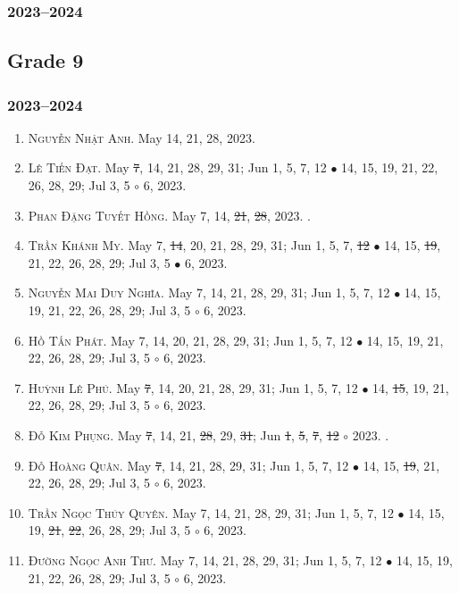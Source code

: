 \documentclass{article}
\begin{document}
\subsubsection{2023--2024}


\subsection{Grade 9}

\subsubsection{2023--2024}

\begin{enumerate}
	\item \textsc{Nguyễn Nhật Anh.} {\sf[In]} May 14, 21, 28, 2023. {\sf[Out]}
	\item \textsc{Lê Tiến Đạt.} May \st{7}, 14, 21, 28, 29, 31; Jun 1, 5, 7, 12 $\bullet$ 14, 15, 19, 21, 22, 26, 28, 29; Jul 3, 5 $\circ$ 6, 2023.
	\item \textsc{Phan Đặng Tuyết Hồng.} May 7, 14, \st{21}, \st{28}, 2023. {}. {\sf[Out]}
	\item \textsc{Trần Khánh My.} May 7, \st{14}, 20, 21,  28, 29, 31; Jun 1, 5, 7, \st{12} $\bullet$ 14, 15, \st{19}, 21, 22, 26, 28, 29; Jul 3, 5 $\bullet$ 6, 2023.
	\item \textsc{Nguyễn Mai Duy Nghĩa.} May 7, 14, 21,  28, 29, 31; Jun 1, 5, 7, 12 $\bullet$ 14, 15, 19, 21, 22, 26, 28, 29; Jul 3, 5 $\circ$ 6, 2023.
	\item \textsc{Hồ Tấn Phát.} May 7, 14, 20, 21, 28, 29, 31; Jun 1, 5, 7, 12 $\bullet$ 14, 15, 19, 21, 22, 26, 28, 29; Jul 3, 5 $\circ$ 6, 2023.
	\item \textsc{Huỳnh Lê Phú.} May \st{7}, 14, 20, 21, 28, 29, 31; Jun 1, 5, 7, 12 $\bullet$ 14, \st{15}, 19, 21, 22, 26, 28, 29; Jul 3, 5 $\circ$ 6, 2023.
	\item \textsc{Đỗ Kim Phụng.} May \st{7}, 14, 21, \st{28}, 29, \st{31}; Jun \st{1}, \st{5}, \st{7}, \st{12} $\circ$ 2023. {}. {\sf[Out]}
	\item \textsc{Đỗ Hoàng Quân.} May \st{7}, 14, 21, 28, 29, 31; Jun 1, 5, 7, 12 $\bullet$ 14, 15, \st{19}, 21, 22, 26, 28, 29; Jul 3, 5 $\circ$ 6, 2023.
	\item \textsc{Trần Ngọc Thúy Quyên.} May 7, 14, 21, 28, 29, 31; Jun 1, 5, 7, 12 $\bullet$ 14, 15, 19, \st{21}, \st{22}, 26, 28, 29; Jul 3, 5 $\circ$ 6, 2023.
	\item \textsc{Đường Ngọc Anh Thư.} May 7, 14, 21, 28, 29, 31; Jun 1, 5, 7, 12 $\bullet$ 14, 15, 19, 21, 22, 26, 28, 29; Jul 3, 5 $\circ$ 6, 2023.
\end{enumerate}
\end{document}

